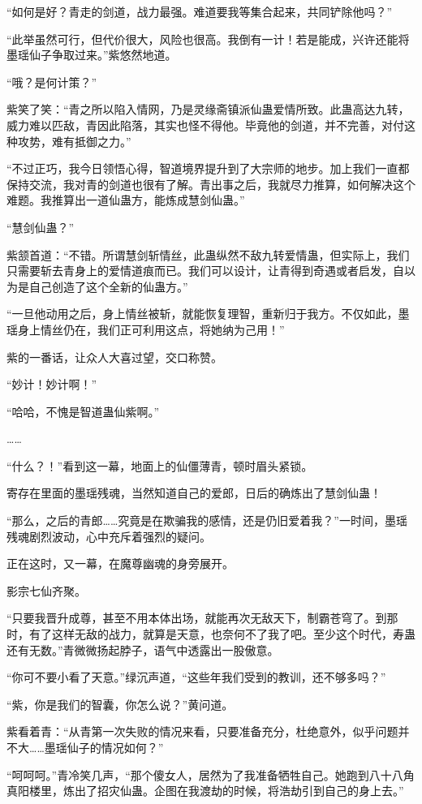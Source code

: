 \begin{this_body}
“如何是好？青走的剑道，战力最强。难道要我等集合起来，共同铲除他吗？”

“此举虽然可行，但代价很大，风险也很高。我倒有一计！若是能成，兴许还能将墨瑶仙子争取过来。”紫悠然地道。

“哦？是何计策？”

紫笑了笑：“青之所以陷入情网，乃是灵缘斋镇派仙蛊爱情所致。此蛊高达九转，威力难以匹敌，青因此陷落，其实也怪不得他。毕竟他的剑道，并不完善，对付这种攻势，难有抵御之力。”

“不过正巧，我今日领悟心得，智道境界提升到了大宗师的地步。加上我们一直都保持交流，我对青的剑道也很有了解。青出事之后，我就尽力推算，如何解决这个难题。我推算出一道仙蛊方，能炼成慧剑仙蛊。”

“慧剑仙蛊？”

紫颔首道：“不错。所谓慧剑斩情丝，此蛊纵然不敌九转爱情蛊，但实际上，我们只需要斩去青身上的爱情道痕而已。我们可以设计，让青得到奇遇或者启发，自以为是自己创造了这个全新的仙蛊方。”

“一旦他动用之后，身上情丝被斩，就能恢复理智，重新归于我方。不仅如此，墨瑶身上情丝仍在，我们正可利用这点，将她纳为己用！”

紫的一番话，让众人大喜过望，交口称赞。

“妙计！妙计啊！”

“哈哈，不愧是智道蛊仙紫啊。”

……

“什么？！”看到这一幕，地面上的仙僵薄青，顿时眉头紧锁。

寄存在里面的墨瑶残魂，当然知道自己的爱郎，日后的确炼出了慧剑仙蛊！

“那么，之后的青郎……究竟是在欺骗我的感情，还是仍旧爱着我？”一时间，墨瑶残魂剧烈波动，心中充斥着强烈的疑问。

正在这时，又一幕，在魔尊幽魂的身旁展开。

影宗七仙齐聚。

“只要我晋升成尊，甚至不用本体出场，就能再次无敌天下，制霸苍穹了。到那时，有了这样无敌的战力，就算是天意，也奈何不了我了吧。至少这个时代，寿蛊还有无数。”青微微扬起脖子，语气中透露出一股傲意。

“你可不要小看了天意。”绿沉声道，“这些年我们受到的教训，还不够多吗？”

“紫，你是我们的智囊，你怎么说？”黄问道。

紫看着青：“从青第一次失败的情况来看，只要准备充分，杜绝意外，似乎问题并不大……墨瑶仙子的情况如何？”

“呵呵呵。”青冷笑几声，“那个傻女人，居然为了我准备牺牲自己。她跑到八十八角真阳楼里，炼出了招灾仙蛊。企图在我渡劫的时候，将浩劫引到自己的身上去。”


\end{this_body}
